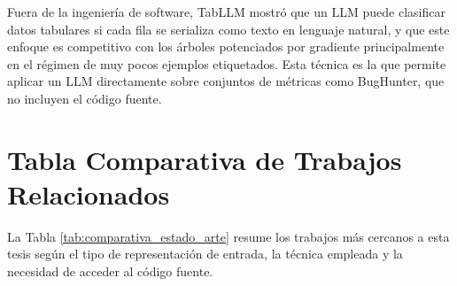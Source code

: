 Fuera de la ingeniería de software, TabLLM \cite{hegselmann2023tabllm} mostró que un LLM puede clasificar datos tabulares si cada fila se serializa como texto en lenguaje natural, y que este enfoque es competitivo con los árboles potenciados por gradiente principalmente en el régimen de muy pocos ejemplos etiquetados. Esta técnica es la que permite aplicar un LLM directamente sobre conjuntos de métricas como BugHunter, que no incluyen el código fuente.

\section{Tabla Comparativa de Trabajos Relacionados}

La Tabla \ref{tab:comparativa_estado_arte} resume los trabajos más cercanos a esta tesis según el tipo de representación de entrada, la técnica empleada y la necesidad de acceder al código fuente.

